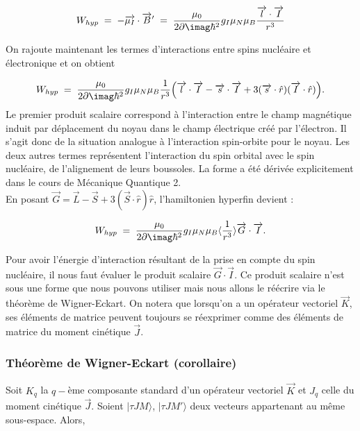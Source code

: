 \[
    W_{hyp} \eq
    - \overrightarrow{\mu_I} \cdot \overrightarrow{B}'
    \eq
    \dfrac{\mu_0}{2\p\imag\hbar^2} g_I \mu_N \mu_B \dfrac{\overrightarrow{l}\cdot\overrightarrow{I}}{r^3}
\]

 On rajoute maintenant les termes d'interactions entre spins nucléaire et électronique et on obtient

\begin{equation}
    W_{hyp} \eq  \dfrac{\mu_0}{2\p\imag\hbar^2}g_I\mu_N\mu_B\dfrac{1}{r^3}\Big( \overrightarrow{l}\cdot\overrightarrow{I}-\overrightarrow{s}\cdot\overrightarrow{I} + 3(\overrightarrow{s}\cdot\hat{r})(\overrightarrow{I}\cdot\hat{r}) \Big).
\end{equation}
Le premier produit scalaire correspond à l'interaction entre le champ magnétique induit par déplacement du noyau dans le champ électrique créé par l'électron. Il s'agit donc de la situation analogue à l'interaction spin-orbite pour le noyau. Les deux autres termes représentent l'interaction du spin orbital avec le spin nucléaire, de l'alignement de leurs boussoles. La forme a été dérivée explicitement dans le cours de Mécanique Quantique 2.\\
En posant $\overrightarrow{G} = \overrightarrow{L} - \overrightarrow{S} + 3(\overrightarrow{S}\cdot\hat{r}) \hat{r}$, l'hamiltonien hyperfin devient :

\begin{equation}
     W_{hyp} \eq  \dfrac{\mu_0}{2\p\imag\hbar^2}g_I\mu_N\mu_B\langle\dfrac{1}{r^3}\rangle \overrightarrow{G}\cdot\overrightarrow{I}.
\end{equation}

Pour avoir l’énergie d’interaction résultant de la prise en compte du spin nucléaire, il nous faut évaluer le produit scalaire $\overrightarrow{G} \cdot \overrightarrow{I}$. Ce produit scalaire n’est sous une forme que nous pouvons utiliser mais nous allons le réécrire via le théorème de Wigner-Eckart. On notera que lorsqu’on a un opérateur vectoriel $\overrightarrow{K}$, ses éléments de matrice peuvent toujours se réexprimer comme des éléments de matrice du moment cinétique $\overrightarrow{J}$.



    \subsubsection{Théorème de Wigner-Eckart (corollaire)}



Soit $K_q$ la $q-$ème composante standard d'un opérateur vectoriel $\overrightarrow{K}$ et $J_q$ celle du moment cinétique $\overrightarrow{J}$. Soient $|\tau JM\rangle$, $|\tau JM'\rangle$ deux vecteurs appartenant au même sous-espace. Alors,

